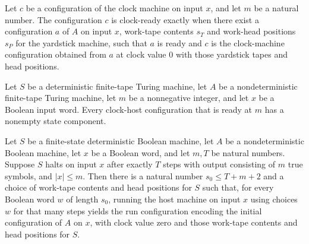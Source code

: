 \begin{definition}
\label{Turing.ClockHost.ClockReady}
\leanok
{}
Let $c$ be a configuration of the clock machine on input $x$, and let $m$ be a natural
number. The configuration $c$ is clock-ready exactly when there exist a configuration
$a$ of $A$ on input $x$, work-tape contents $s_T$ and work-head positions $s_P$ for the
yardstick machine, such that $a$ is ready and $c$ is the clock-machine configuration
obtained from $a$ at clock value $0$ with those yardstick tapes and head positions.
\end{definition}

\begin{theorem}
\label{Turing.ClockHost.ClockReady.state_ne_none}
\leanok
{}
Let $S$ be a deterministic finite-tape Turing machine, let $A$ be a nondeterministic
finite-tape Turing machine, let $m$ be a nonnegative integer, and let $x$ be a Boolean
input word. Every clock-host configuration that is ready at $m$ has a nonempty state
component.
\end{theorem}

\begin{theorem}
\label{Turing.ClockHost.startup}
\leanok
{}
Let $S$ be a finite-state deterministic Boolean machine, let $A$ be a nondeterministic
Boolean machine, let $x$ be a Boolean word, and let $m,T$ be natural numbers. Suppose
$S$ halts on input $x$ after exactly $T$ steps with output consisting of $m$ true
symbols, and $|x|\le m$. Then there is a natural number $s_0\le T+m+2$ and a choice of
work-tape contents and head positions for $S$ such that, for every Boolean word $w$ of
length $s_0$, running the host machine on input $x$ using choices $w$ for that many
steps yields the run configuration encoding the initial configuration of $A$ on $x$,
with clock value zero and those work-tape contents and head positions for $S$.
\end{theorem}

